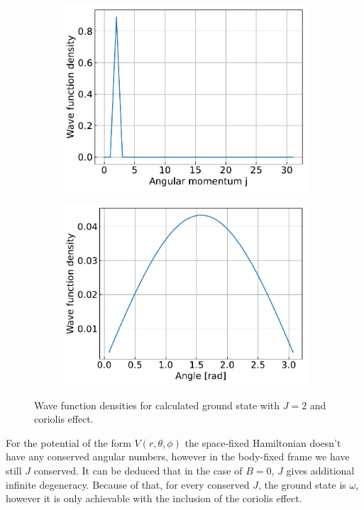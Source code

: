 \documentclass{article}
\begin{document}
\begin{figure}[H]
\begin{subfigure}{.4\linewidth}
            \includegraphics[width=\linewidth]{harmonic_iso_coriolis_angular.pdf}
        \end{subfigure}
        \begin{subfigure}{.4\linewidth}
            \centering
            \includegraphics[width=\linewidth]{harmonic_iso_coriolis_polar.pdf}
        \end{subfigure}   
        \caption{Wave function densities for calculated ground state with $J = 2$ and coriolis effect.}
    \end{figure}

    For the potential of the form $V(r, \theta, \phi)$ the space-fixed Hamiltonian doesn't have any
    conserved angular numbers, however in the body-fixed frame we have still $J$ conserved.
    It can be deduced that in the case of $B = 0$, $J$ gives additional infinite degeneracy.
    Because of that, for every conserved $J$, the ground state is $\omega$, however it is only achievable
    with the inclusion of the coriolis effect.
\end{document}
